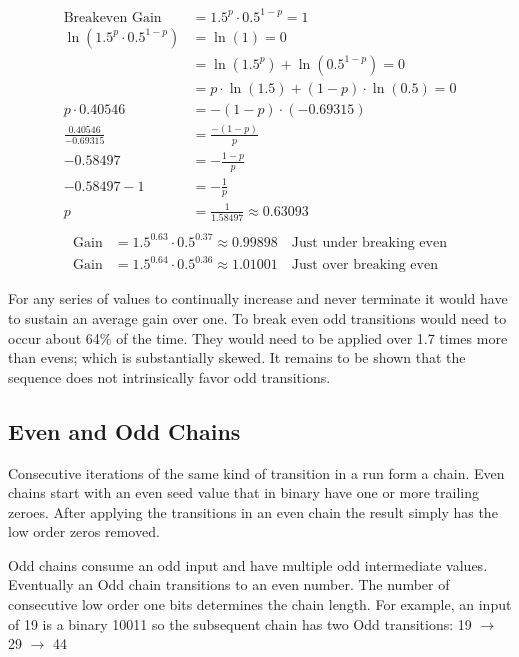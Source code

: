 \documentclass[letterpaper]{article}
\begin{document}
\begin{align*}
    \text{Breakeven Gain} &= 1.5^p \cdot 0.5^{1-p} = 1 \\
    \ln\left( 1.5^p \cdot 0.5^{1-p} \right) &= \ln(1) = 0 \\
    &= \ln(1.5^p) + \ln(0.5^{1-p}) = 0 \\
    &= p \cdot \ln(1.5) + (1-p) \cdot \ln(0.5) = 0 \\
    p \cdot 0.40546 &= -(1-p) \cdot (-0.69315) \\
    \frac{0.40546}{-0.69315} &= \frac{-(1-p)}{p} \\
    -0.58497 &= -\frac{1-p}{p} \\
    -0.58497 - 1 &= -\frac{1}{p} \\
    p &= \frac{1}{1.58497} \approx 0.63093 \\
\end{align*}
\begin{align*}
    \text{Gain} &= 1.5^{0.63} \cdot 0.5^{0.37} \approx 0.99898 \quad \text{Just under breaking even} \\
    \text{Gain} &= 1.5^{0.64} \cdot 0.5^{0.36} \approx 1.01001 \quad \text{Just over breaking even}
\end{align*}

For any series of values to continually increase and never terminate it would have to sustain an average gain over one. To break even odd transitions would need to occur about 64\% of the time. They would need to be applied over 1.7 times more than evens; which is substantially skewed. It remains to be shown that the sequence does not intrinsically favor odd transitions.

\subsection{Even and Odd Chains}

Consecutive iterations of the same kind of transition in a run form a chain. Even chains start with an even seed value that in binary have one or more trailing zeroes. After applying the transitions in an even chain the result simply has the low order zeros removed.

Odd chains consume an odd input and have multiple odd intermediate values. Eventually an Odd chain transitions to an even number. The number of consecutive low order one bits determines the chain length. For example, an input of 19 is a binary 10011 so the subsequent chain has two Odd transitions: 19 $\to$ 29 $\to$ 44
\end{document}
